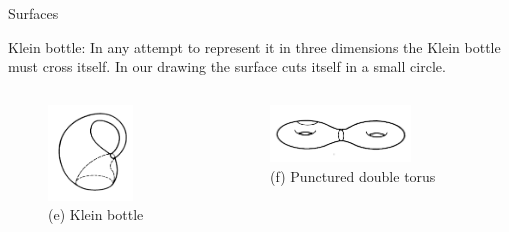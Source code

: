 \documentclass{beamer}
\begin{document}
\begin{frame}{Surfaces}
  \begin{block}{}
    Klein bottle: In any attempt to represent it in three dimensions the Klein bottle must cross itself. In our drawing the surface cuts itself in a small circle.
  \end{block}
  \begin{columns}
    \begin{column}{0.5\textwidth}
      \begin{figure}
        \centering
        \includegraphics[width=0.7\textwidth]{figure_1_10_e.png}
        \caption{(e) Klein bottle}
      \end{figure}
    \end{column}
    \begin{column}{0.5\textwidth}
      \begin{figure}
        \centering
        \includegraphics[width=0.7\textwidth]{figure_1_10_f.png}
        \caption{(f) Punctured double torus}
      \end{figure}
    \end{column}
  \end{columns}
\end{frame}
\end{document}
